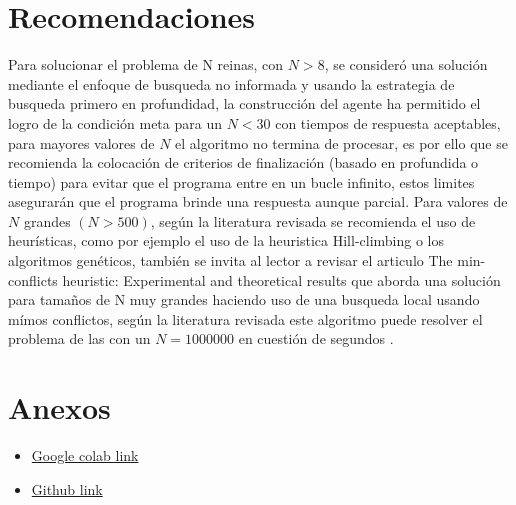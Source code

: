 \documentclass[conference]{IEEEtran}
\begin{document}
\section{Recomendaciones}
Para solucionar el problema de N reinas, con $N > 8$, se consideró una solución mediante el enfoque de busqueda no informada y usando la estrategia de busqueda primero en profundidad, la construcción del agente ha permitido el logro de la condición meta para un $N < 30$ con tiempos de respuesta aceptables, para mayores valores  de $N$ el algoritmo no termina de procesar, es por ello que se recomienda la colocación de criterios de finalización (basado en profundida o tiempo) para evitar que el programa entre en un bucle infinito, estos limites asegurarán que el programa brinde una respuesta aunque parcial.
Para valores de $N$ grandes $(N>500)$, según la literatura revisada se recomienda el uso de heurísticas, como por ejemplo el uso de la heuristica Hill-climbing o los algoritmos genéticos, también se invita al lector a revisar el articulo The min-conflicts heuristic: Experimental and theoretical results \cite{r4_nasa} que aborda una solución para tamaños de N muy grandes haciendo uso de una busqueda local usando mímos conflictos, según la literatura revisada este algoritmo puede resolver el problema de las con un  $N = 1000000$ en cuestión de segundos \cite{r2}.


\renewcommand{\bibfont}{\footnotesize}
\printbibliography

\section*{Anexos}
\begin{itemize}
    \item \href{https://colab.research.google.com/drive/1JE-wPFCCjOML7mjrXCpK68u2_0-X67MF?usp=sharing}{Google colab link}
    \item \href{https://github.com/yancalderon/n-queens}{Github link}
\end{itemize}
\end{document}
